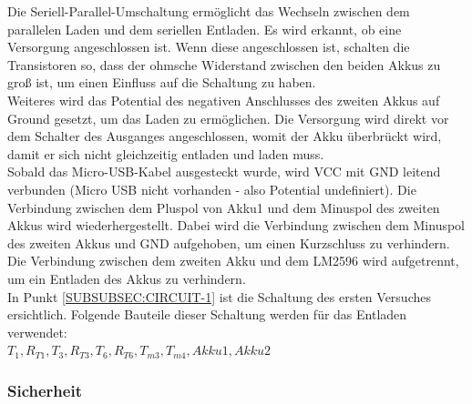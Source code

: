 \documentclass[12pt,a4paper]{article}
\begin{document}
Die Seriell-Parallel-Umschaltung ermöglicht das Wechseln zwischen dem parallelen Laden und dem seriellen Entladen. Es wird erkannt, ob eine Versorgung angeschlossen ist. Wenn diese angeschlossen ist, schalten die Transistoren so, dass der ohmsche Widerstand zwischen den beiden Akkus zu groß ist, um einen Einfluss auf die Schaltung zu haben.\\
Weiteres wird das Potential des negativen Anschlusses des zweiten Akkus auf Ground gesetzt, um das Laden zu ermöglichen. Die Versorgung wird direkt vor dem Schalter des Ausganges angeschlossen, womit der Akku überbrückt wird, damit er sich nicht gleichzeitig entladen und laden muss. \\[2ex] 
Sobald das Micro-USB-Kabel ausgesteckt wurde, wird VCC mit GND leitend verbunden (Micro USB nicht vorhanden - also Potential undefiniert). Die Verbindung zwischen dem Pluspol von Akku1 und dem Minuspol des zweiten Akkus wird wiederhergestellt. Dabei wird die Verbindung zwischen dem Minuspol des zweiten Akkus und GND aufgehoben, um einen Kurzschluss zu verhindern.  \\
Die Verbindung zwischen dem zweiten Akku und dem LM2596 wird aufgetrennt, um ein Entladen des Akkus zu verhindern. \\
In Punkt \ref{SUBSUBSEC:CIRCUIT-1} ist die Schaltung des ersten Versuches ersichtlich. Folgende Bauteile dieser Schaltung werden für das Entladen verwendet:\\ $T_1,R_{T1},T_3,R_{T3},T_6,R_{T6},T_{m3},T_{m4}, Akku1, Akku2$ \\

\subsubsection{Sicherheit}
\label{SUBSUBSEC:Security1}
\end{document}
